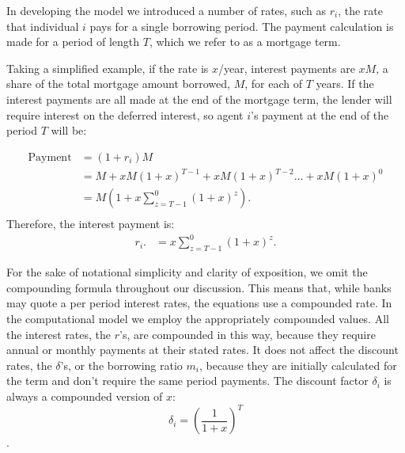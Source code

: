 In developing the model we introduced a number of rates, such as $r_i$, the rate that individual $i$ pays for a single borrowing period. The payment calculation is made for a period of length $T$, which we refer to as a mortgage term.

Taking a simplified example, if the rate is $x$/year, interest payments are $xM$, a share of the total mortgage amount borrowed, $M$, for each of $T$ years. 
If the interest payments are all made at the end of the mortgage term, the lender will require interest on the deferred interest, so agent $i$'s payment at the end of the period $T$ will be:

\begin{align*}
\text{Payment} &= (1+r_i)M                                            \\ 
    &= M + xM(1+x)^{T-1}+ xM(1+x)^{T-2}\dots + xM(1+x)^{0} \\
    &= M\left(1+ x\sum_{z=T-1}^0(1+x)^{z}\right).          \\ 
\end{align*}
Therefore, the interest payment is:
\begin{align*}
r_i.   &=x\sum_{z=T-1}^0(1+x)^{z}.
\end{align*}

For the sake of notational simplicity and clarity of exposition,  we omit the compounding formula throughout our discussion. This means that, while banks may quote a per period interest rates, the equations use a compounded rate. In the computational model we employ the appropriately compounded values. All %
 the interest rates, the $r$'s, are compounded in this way, because they require annual or monthly payments at their stated rates.
 It does not affect the discount rates, the $\delta$'s, or the borrowing ratio $m_i$, because they are initially calculated for the term and don't require the same period payments.
 The discount factor $\delta_i$ is always a compounded version of $x$:
 \[\delta_i=\left(\frac{1}{1+x}\right)^T\].

